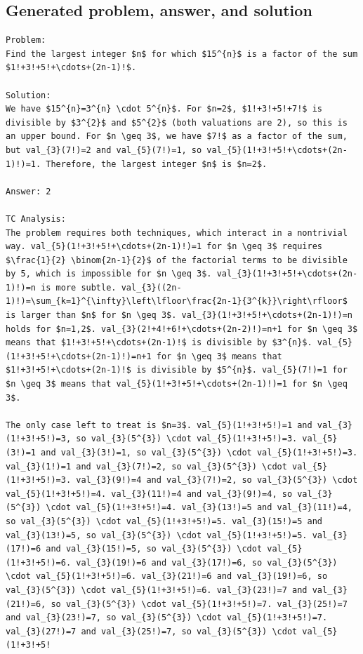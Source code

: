 \documentclass[11pt]{article}
\begin{document}
\subsection*{Generated problem, answer, and solution}
\begin{lstlisting}[style=modeloutput]
Problem:
Find the largest integer $n$ for which $15^{n}$ is a factor of the sum $1!+3!+5!+\cdots+(2n-1)!$.

Solution:
We have $15^{n}=3^{n} \cdot 5^{n}$. For $n=2$, $1!+3!+5!+7!$ is divisible by $3^{2}$ and $5^{2}$ (both valuations are 2), so this is an upper bound. For $n \geq 3$, we have $7!$ as a factor of the sum, but val_{3}(7!)=2 and val_{5}(7!)=1, so val_{5}(1!+3!+5!+\cdots+(2n-1)!)=1. Therefore, the largest integer $n$ is $n=2$.

Answer: 2

TC Analysis:
The problem requires both techniques, which interact in a nontrivial way. val_{5}(1!+3!+5!+\cdots+(2n-1)!)=1 for $n \geq 3$ requires $\frac{1}{2} \binom{2n-1}{2}$ of the factorial terms to be divisible by 5, which is impossible for $n \geq 3$. val_{3}(1!+3!+5!+\cdots+(2n-1)!)=n is more subtle. val_{3}((2n-1)!)=\sum_{k=1}^{\infty}\left\lfloor\frac{2n-1}{3^{k}}\right\rfloor$ is larger than $n$ for $n \geq 3$. val_{3}(1!+3!+5!+\cdots+(2n-1)!)=n holds for $n=1,2$. val_{3}(2!+4!+6!+\cdots+(2n-2)!)=n+1 for $n \geq 3$ means that $1!+3!+5!+\cdots+(2n-1)!$ is divisible by $3^{n}$. val_{5}(1!+3!+5!+\cdots+(2n-1)!)=n+1 for $n \geq 3$ means that $1!+3!+5!+\cdots+(2n-1)!$ is divisible by $5^{n}$. val_{5}(7!)=1 for $n \geq 3$ means that val_{5}(1!+3!+5!+\cdots+(2n-1)!)=1 for $n \geq 3$.

The only case left to treat is $n=3$. val_{5}(1!+3!+5!)=1 and val_{3}(1!+3!+5!)=3, so val_{3}(5^{3}) \cdot val_{5}(1!+3!+5!)=3. val_{5}(3!)=1 and val_{3}(3!)=1, so val_{3}(5^{3}) \cdot val_{5}(1!+3!+5!)=3. val_{3}(1!)=1 and val_{3}(7!)=2, so val_{3}(5^{3}) \cdot val_{5}(1!+3!+5!)=3. val_{3}(9!)=4 and val_{3}(7!)=2, so val_{3}(5^{3}) \cdot val_{5}(1!+3!+5!)=4. val_{3}(11!)=4 and val_{3}(9!)=4, so val_{3}(5^{3}) \cdot val_{5}(1!+3!+5!)=4. val_{3}(13!)=5 and val_{3}(11!)=4, so val_{3}(5^{3}) \cdot val_{5}(1!+3!+5!)=5. val_{3}(15!)=5 and val_{3}(13!)=5, so val_{3}(5^{3}) \cdot val_{5}(1!+3!+5!)=5. val_{3}(17!)=6 and val_{3}(15!)=5, so val_{3}(5^{3}) \cdot val_{5}(1!+3!+5!)=6. val_{3}(19!)=6 and val_{3}(17!)=6, so val_{3}(5^{3}) \cdot val_{5}(1!+3!+5!)=6. val_{3}(21!)=6 and val_{3}(19!)=6, so val_{3}(5^{3}) \cdot val_{5}(1!+3!+5!)=6. val_{3}(23!)=7 and val_{3}(21!)=6, so val_{3}(5^{3}) \cdot val_{5}(1!+3!+5!)=7. val_{3}(25!)=7 and val_{3}(23!)=7, so val_{3}(5^{3}) \cdot val_{5}(1!+3!+5!)=7. val_{3}(27!)=7 and val_{3}(25!)=7, so val_{3}(5^{3}) \cdot val_{5}(1!+3!+5!
\end{lstlisting}
\clearpage
\end{document}
